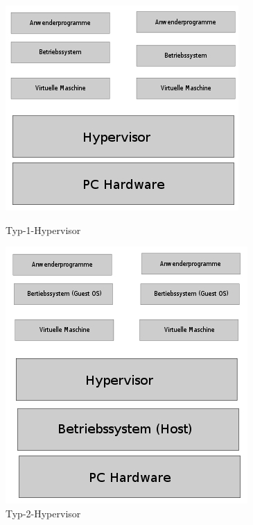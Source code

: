 \documentclass[10pt]{article}
\begin{document}
\begin{figure}[H]%
  \centering
  \begin{minipage}[H]{0.4\textwidth}
    \includegraphics[width=\textwidth]{Bilder/hypervisorTyp1.jpg}
    \caption{Typ-1-Hypervisor}
  \end{minipage}
  \hfill
  \begin{minipage}[H]{0.4\textwidth}
    \includegraphics[width=\textwidth]{Bilder/hypervisorTyp2.jpg}
    \caption{Typ-2-Hypervisor}
  \end{minipage}
\end{figure}
	
\end{document}
